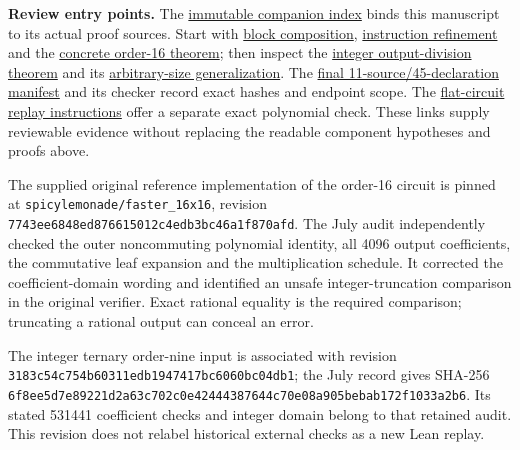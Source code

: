 \documentclass[
  11pt,
]{article}
\begin{document}
\textbf{Review entry points.} The
\href{https://github.com/alejandrozu/openmath-2026-judging/blob/9e13c89a51a62958ced9ebdf16da31f5e2fb3cdd/personal-matrix-hybrid-2026-10-07/CURRENT_GUIDE.md}{immutable
companion index} binds this manuscript to its actual proof sources.
Start with
\href{https://github.com/alejandrozu/openmath-2026-judging/blob/9e13c89a51a62958ced9ebdf16da31f5e2fb3cdd/personal-matrix-hybrid-2026-10-07/lean/BlockComposition.lean}{block
composition},
\href{https://github.com/alejandrozu/openmath-2026-judging/blob/9e13c89a51a62958ced9ebdf16da31f5e2fb3cdd/personal-matrix-hybrid-2026-10-07/lean/DAGRefinement.lean}{instruction
refinement} and the
\href{https://github.com/alejandrozu/openmath-2026-judging/blob/9e13c89a51a62958ced9ebdf16da31f5e2fb3cdd/personal-matrix-hybrid-2026-10-07/lean/Concrete16.lean}{concrete
order-16 theorem}; then inspect the
\href{https://github.com/alejandrozu/openmath-2026-judging/blob/9e13c89a51a62958ced9ebdf16da31f5e2fb3cdd/personal-matrix-hybrid-2026-10-07/lean/IntegerLateDivision.lean}{integer
output-division theorem} and its
\href{https://github.com/alejandrozu/openmath-2026-judging/blob/9e13c89a51a62958ced9ebdf16da31f5e2fb3cdd/personal-matrix-hybrid-2026-10-07/lean/IntegerGeneralization.lean}{arbitrary-size
generalization}. The
\href{https://github.com/alejandrozu/openmath-2026-judging/blob/9e13c89a51a62958ced9ebdf16da31f5e2fb3cdd/personal-matrix-hybrid-2026-10-07/lean/final_source_manifest.json}{final
11-source/45-declaration manifest} and its checker record exact hashes
and endpoint scope. The
\href{https://github.com/alejandrozu/openmath-2026-judging/blob/9e13c89a51a62958ced9ebdf16da31f5e2fb3cdd/personal-matrix-hybrid-2026-10-07/circuit/README.md}{flat-circuit
replay instructions} offer a separate exact polynomial check. These
links supply reviewable evidence without replacing the readable
component hypotheses and proofs above.

The supplied original reference implementation of the order-16 circuit
is pinned at \texttt{spicylemonade/faster\_16x16}, revision
\texttt{7743ee6848ed876615012c4edb3bc46a1f870afd}. The July audit
independently checked the outer noncommuting polynomial identity, all
4096 output coefficients, the commutative leaf expansion and the
multiplication schedule. It corrected the coefficient-domain wording and
identified an unsafe integer-truncation comparison in the original
verifier. Exact rational equality is the required comparison; truncating
a rational output can conceal an error.

The integer ternary order-nine input is associated with revision
\texttt{3183c54c754b60311edb1947417bc6060bc04db1}; the July record gives
SHA-256
\texttt{6f8ee5d7e89221d2a63c702c0e42444387644c70e08a905bebab172f1033a2b6}.
Its stated 531441 coefficient checks and integer domain belong to that
retained audit. This revision does not relabel historical external
checks as a new Lean replay.
\end{document}
